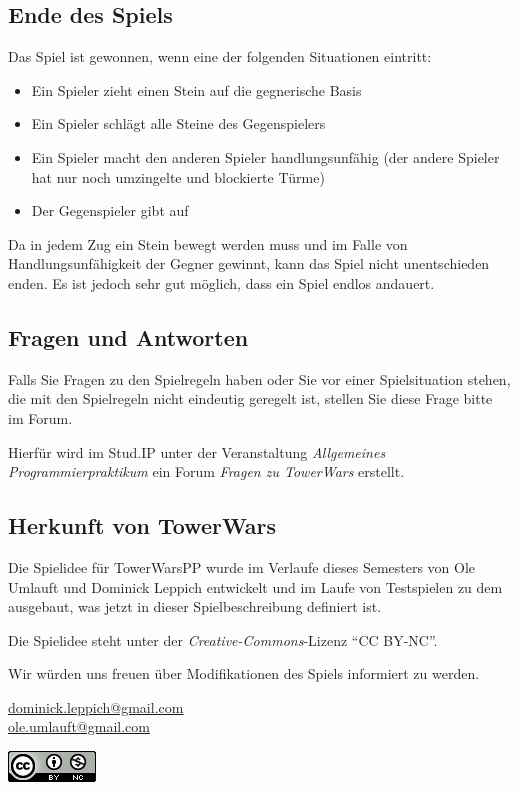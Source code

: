 

\subsection*{Ende des Spiels}
Das Spiel ist gewonnen, wenn eine der folgenden Situationen eintritt:
\begin{itemize}
\item Ein Spieler zieht einen Stein auf die gegnerische Basis
\item Ein Spieler schlägt alle Steine des Gegenspielers
\item Ein Spieler macht den anderen Spieler handlungsunfähig (der andere Spieler hat nur noch umzingelte und blockierte Türme)
\item Der Gegenspieler gibt auf
\end{itemize}

Da in jedem Zug ein Stein bewegt werden muss und im Falle von Handlungsunfähigkeit der Gegner gewinnt, kann das Spiel nicht unentschieden enden. Es ist jedoch sehr gut möglich, dass ein Spiel endlos andauert.

\subsection*{Fragen und Antworten}
Falls Sie Fragen zu den Spielregeln haben oder Sie vor einer Spielsituation stehen, die mit den Spielregeln nicht eindeutig geregelt ist, stellen Sie diese Frage bitte im Forum.

Hierfür wird im Stud.IP unter der Veranstaltung \textit{Allgemeines Programmierpraktikum} ein Forum \textit{Fragen zu TowerWars} erstellt.

\subsection*{Herkunft von TowerWars}
Die Spielidee für TowerWarsPP wurde im Verlaufe dieses Semesters von Ole Umlauft und Dominick Leppich entwickelt und im Laufe von Testspielen zu dem ausgebaut, was jetzt in dieser Spielbeschreibung definiert ist.

Die Spielidee steht unter der \emph{Creative-Commons}-Lizenz ``CC BY-NC''.

Wir würden uns freuen über Modifikationen des Spiels informiert zu werden.

\href{mailto:dominick.leppich@gmail.com}{dominick.leppich@gmail.com} \\
\href{mailto:ole.umlauft@gmail.com}{ole.umlauft@gmail.com}
\begin{flushright}
\includegraphics[scale=0.7]{graphic/cc.png}
\end{flushright}